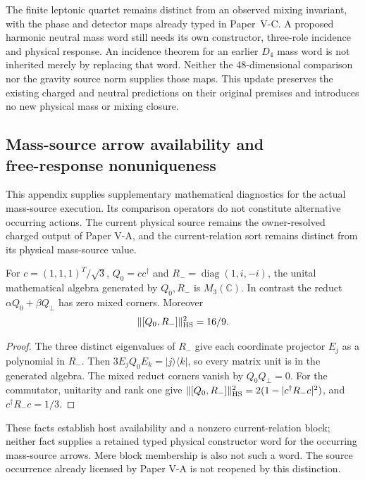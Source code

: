 \documentclass[12pt,a4paper]{article}
\begin{document}
The finite leptonic quartet remains distinct from an observed mixing
invariant, with the phase and detector maps already typed in Paper~V-C.
A proposed harmonic neutral mass word still needs its own constructor,
three-role incidence and physical response. An incidence theorem for
an earlier $D_4$ mass word is not inherited merely by replacing that word.
Neither the 48-dimensional comparison nor the gravity source norm supplies
those maps. This update preserves the existing charged and neutral
predictions on their original premises and introduces no new physical
mass or mixing closure.


\subsection[Mass-source arrow availability and free-response nonuniqueness]{Mass-source arrow availability and\\ free-response nonuniqueness}
\label{p6:app:v2191-electron-arrow-limits}
This appendix supplies supplementary mathematical diagnostics for the
actual mass-source execution. Its comparison operators do not constitute
alternative occurring actions. The current physical source remains the
owner-resolved charged output of Paper V-A, and the current-relation sort
remains distinct from its physical mass-source value.

\begin{proposition}
\label{p6:prop:v2191-parent-algebra}
For $c=(1,1,1)^T/\sqrt3$, $Q_0=cc^\dagger$ and
$R_-=\operatorname{diag}(1,i,-i)$, the unital mathematical algebra generated
by $Q_0,R_-$ is $M_3(\mathbb C)$. In contrast the reduct
$\alpha Q_0+\beta Q_\perp$ has zero mixed corners. Moreover
\[
 \|[Q_0,R_-]\|_{\rm HS}^2=16/9.
\]
\end{proposition}
\begin{proof}
The three distinct eigenvalues of $R_-$ give each coordinate projector
$E_j$ as a polynomial in $R_-$. Then
$3E_jQ_0E_k=|j\rangle\langle k|$, so every matrix unit is in the
generated algebra. The mixed reduct corners vanish by $Q_0Q_\perp=0$.
For the commutator, unitarity and rank one give
$\|[Q_0,R_-]\|_{\rm HS}^2=2(1-|c^\dagger R_-c|^2)$, and
$c^\dagger R_-c=1/3$.
\end{proof}

These facts establish host availability and a nonzero current-relation
block; neither fact supplies a retained typed physical constructor word
for the occurring mass-source arrows. Mere block membership is also not
such a word. The source occurrence already licensed by Paper V-A is not
reopened by this distinction.
\end{document}
